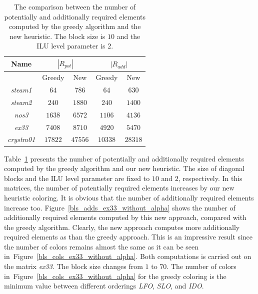 \documentclass[12pt, twoside,a4paper,toc=bibliography]{scrbook}
\newcommand{\figref}[1]{Figure~\protect\ref{#1}}
\begin{document}
\begin{table}
\centering
\begin{tabular}{|c|c|c|c|c|}
\hline
Name & \multicolumn{2}{c|}{$|R_{pot}|$} & \multicolumn{2}{c|}{$|R_{add}|$}\\\hline
{} & Greedy & New & Greedy & New\\\hline
\textit{steam1} & $64$ & $786$ & $64$ & $630$ \\\hline
\textit{steam2} & $240$ & $1880$ & $240$ & $1400$ \\\hline
\textit{nos3} & $1638$ & $6572$ & $1106$ & $4136$ \\\hline
\textit{ex33} & $7408$ & $8710$ & $4920$ & $5470$\\\hline
\textit{crystm01} & $17822$ & $47556$& $10338$ & $28318$\\\hline
\end{tabular}
\caption{The comparison between the number of potentially and additionally required
elements computed by the greedy algorithm and the new heuristic.
The block size is $10$ and the ILU level parameter is $2$.}
\label{mats.pot.add.gr.vs.nreq}
\end{table}

Table~\ref{mats.pot.add.gr.vs.nreq} presents the number of potentially
and additionally required elements computed
by the greedy algorithm and our new heuristic. The size of diagonal blocks
and the ILU level parameter are fixed to $10$ and $2$, respectively.
In this matrices, the number of potentially required elements increases
by our new heuristic coloring.
It is obvious that the number of additionally required elements increase too.
\figref{bls_adds_ex33_without_alpha} shows the number of additionally required elements
computed by this new approach, compared with the greedy algorithm. Clearly,
the new approach computes more additionally required elements as than the greedy approach.
This is an impressive result since the number of colors remains almost the same
as it can be seen in~\figref{bls_cols_ex33_without_alpha}.
Both computations is carried out on the matrix \textit{ex33}. The block size changes
from $1$ to $70$. The number of colors in~\figref{bls_cols_ex33_without_alpha} for the greedy coloring
is the minimum value between different orderings \textit{LFO}, \textit{SLO}, and \textit{IDO}.
\end{document}
